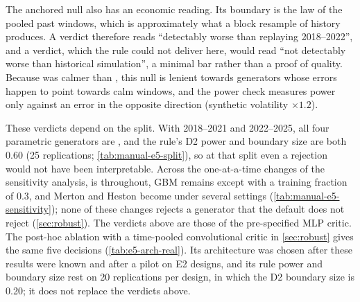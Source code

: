 The anchored null also has an economic reading. Its boundary is the law of the pooled past
windows, which is approximately what a block resample of history produces. A \BAD{} verdict
therefore reads ``detectably worse than replaying 2018--2022'', and a \GOOD{} verdict, which the
rule could not deliver here, would read ``not detectably worse than historical simulation'', a
minimal bar rather than a proof of quality. Because \TEST{} was calmer than \TRAIN{}, this null
is lenient towards generators whose errors happen to point towards calm windows, and the power
check measures power only against an error in the opposite direction (synthetic volatility
$\times1.2$).

These verdicts depend on the split. With \TRAIN{} 2018--2021 and \TEST{} 2022--2025, all four
parametric generators are \INCONCL{}, and the rule's D2 power and boundary size are both 0.60
(25 replications; \cref{tab:manual-e5-split}), so at that split even a rejection would not have
been interpretable. Across the one-at-a-time changes of the sensitivity analysis, \GARCHt{} is
\INCONCL{} throughout, GBM remains \BAD{} except with a training fraction of 0.3, and Merton and
Heston become \INCONCL{} under several settings (\cref{tab:manual-e5-sensitivity}); none of these
changes rejects a generator that the default does not reject (\cref{sec:robust}). The verdicts
above are those of the pre-specified MLP critic. The post-hoc ablation with a time-pooled
convolutional critic in \cref{sec:robust} gives the same five decisions
(\cref{tab:e5-arch-real}). Its architecture was chosen after these results were known and after a
pilot on E2 designs, and its rule power and boundary size rest on 20 replications per design, in
which the D2 boundary size is 0.20; it does not replace the verdicts above.


